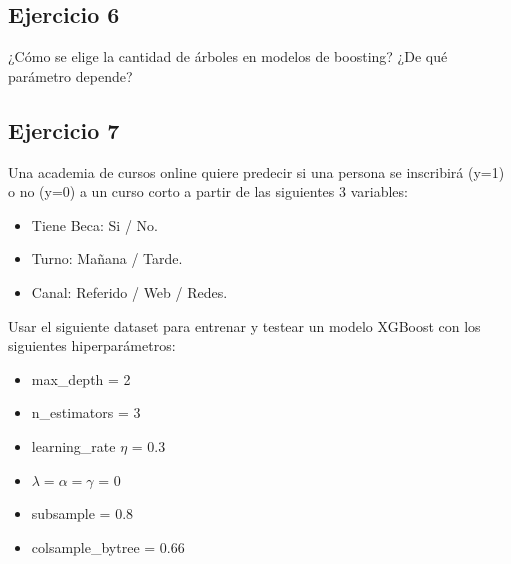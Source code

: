 \documentclass[12pt]{article}
\begin{document}
\subsection{Ejercicio 6}

¿Cómo se elige la cantidad de árboles en modelos de boosting? ¿De qué parámetro depende?

\subsection{Ejercicio 7}

Una academia de cursos online quiere predecir si una persona se inscribirá (y=1) o no (y=0) a un curso corto a partir de las siguientes 3 variables:

\begin{itemize}
    \item Tiene Beca: Si / No.
    \item Turno: Mañana / Tarde.
    \item Canal: Referido / Web / Redes.
\end{itemize}

Usar el siguiente dataset para entrenar y testear un modelo XGBoost con los siguientes hiperparámetros:

\vspace{1em}

\begin{minipage}{0.48\textwidth}
\begin{itemize}
    \item max\_depth = 2
    \item n\_estimators = 3
    \item learning\_rate $\eta$ = 0.3
\end{itemize}
\end{minipage}
\hfill
\begin{minipage}{0.48\textwidth}
\begin{itemize}
    \item $\lambda = \alpha = \gamma$ = 0
    \item subsample = 0.8
    \item colsample\_bytree = 0.66
\end{itemize}
\end{minipage}

\vspace{1em}
\end{document}
